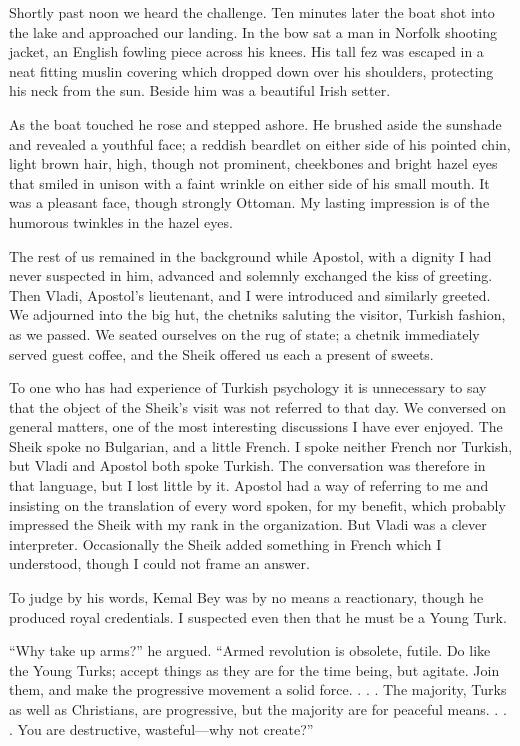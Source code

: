 \documentclass[a5paper,12pt]{book}
\begin{document}
Shortly past noon we heard the challenge. Ten minutes later the boat shot into the lake and approached our landing. In the bow sat a man in Norfolk shooting jacket, an English fowling piece across his knees. His tall fez was escaped in a neat fitting muslin covering which dropped down over his shoulders, protecting his neck from the sun. Beside him was a beautiful Irish setter. 

As the boat touched he rose and stepped ashore. He brushed aside the sunshade and revealed a youthful face; a reddish beardlet on either side of his pointed chin, light brown hair, high, though not prominent, cheekbones and bright hazel eyes that smiled in unison with a faint wrinkle on either side of his small mouth. It was a pleasant face, though strongly Ottoman. My lasting impression is of the humorous twinkles in the hazel eyes. 

The rest of us remained in the background while Apostol, with a dignity I had never suspected in him, advanced and solemnly exchanged the kiss of greeting. Then Vladi, Apostol's lieutenant, and I were introduced and similarly greeted. We adjourned into the big hut, the chetniks saluting the visitor, Turkish fashion, as we passed. We seated ourselves on the rug of state; a chetnik immediately served guest coffee, and the Sheik offered us each a present of sweets. 

To one who has had experience of Turkish psychology it is unnecessary to say that the object of the Sheik’s visit was not referred to that day. We conversed on general matters, one of the most interesting discussions I have ever enjoyed. The Sheik spoke no Bulgarian, and a little French. I spoke neither French nor Turkish, but Vladi and Apostol both spoke Turkish. The conversation was therefore in that language, but I lost little by it. Apostol had a way of referring to me and insisting on the translation of every word spoken, for my benefit, which probably impressed the Sheik with my rank in the organization. But Vladi was a clever interpreter. Occasionally the Sheik added something in French which I understood, though I could not frame an answer. 

To judge by his words, Kemal Bey was by no means a reactionary, though he produced royal credentials. I suspected even then that he must be a Young Turk. 

“Why take up arms?” he argued. “Armed revolution is obsolete, futile. Do like the Young Turks; accept things as they are for the time being, but agitate. Join them, and make the progressive movement a solid force. . . . The majority, Turks as well as Christians, are progressive, but the majority are for peaceful means. . . . You are destructive, wasteful—why not create?” 
\end{document}
